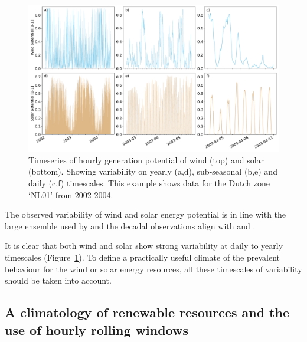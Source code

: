 \documentclass[12pt]{iopart}
\begin{document}
\begin{figure}[ht]
        \centering
        \includegraphics[width=\textwidth]{Figures/Climatological_Behaviour.pdf}
        \caption{
                Timeseries of hourly generation potential of wind (top) and solar (bottom). 
                Showing variability on yearly (a,d), sub-seasonal (b,e) and daily (c,f) timescales. 
                This example shows data for the Dutch zone `NL01' from 2002-2004.}
        \label{fig:climatological_behaviour}
\end{figure}

The observed variability of wind and solar energy potential is in line with the large ensemble used by \textcite{vanderwiel2019extreme} and the decadal observations align with \textcite{Bett2013} and \textcite{wohland2019significant}.

It is clear that both wind and solar show strong variability at daily to yearly timescales (Figure~\ref{fig:climatological_behaviour}). 
To define a practically useful climate of the prevalent behaviour for the wind or solar energy resources, all these timescales of variability should be taken into account.









\subsection{A climatology of renewable resources and the use of hourly rolling windows}
\end{document}
